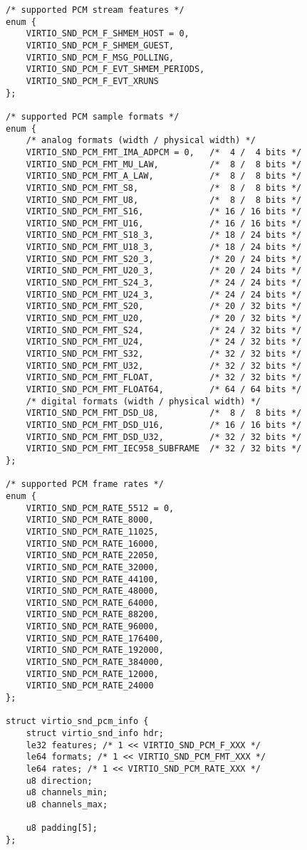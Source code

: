 \begin{lstlisting}
/* supported PCM stream features */
enum {
    VIRTIO_SND_PCM_F_SHMEM_HOST = 0,
    VIRTIO_SND_PCM_F_SHMEM_GUEST,
    VIRTIO_SND_PCM_F_MSG_POLLING,
    VIRTIO_SND_PCM_F_EVT_SHMEM_PERIODS,
    VIRTIO_SND_PCM_F_EVT_XRUNS
};

/* supported PCM sample formats */
enum {
    /* analog formats (width / physical width) */
    VIRTIO_SND_PCM_FMT_IMA_ADPCM = 0,   /*  4 /  4 bits */
    VIRTIO_SND_PCM_FMT_MU_LAW,          /*  8 /  8 bits */
    VIRTIO_SND_PCM_FMT_A_LAW,           /*  8 /  8 bits */
    VIRTIO_SND_PCM_FMT_S8,              /*  8 /  8 bits */
    VIRTIO_SND_PCM_FMT_U8,              /*  8 /  8 bits */
    VIRTIO_SND_PCM_FMT_S16,             /* 16 / 16 bits */
    VIRTIO_SND_PCM_FMT_U16,             /* 16 / 16 bits */
    VIRTIO_SND_PCM_FMT_S18_3,           /* 18 / 24 bits */
    VIRTIO_SND_PCM_FMT_U18_3,           /* 18 / 24 bits */
    VIRTIO_SND_PCM_FMT_S20_3,           /* 20 / 24 bits */
    VIRTIO_SND_PCM_FMT_U20_3,           /* 20 / 24 bits */
    VIRTIO_SND_PCM_FMT_S24_3,           /* 24 / 24 bits */
    VIRTIO_SND_PCM_FMT_U24_3,           /* 24 / 24 bits */
    VIRTIO_SND_PCM_FMT_S20,             /* 20 / 32 bits */
    VIRTIO_SND_PCM_FMT_U20,             /* 20 / 32 bits */
    VIRTIO_SND_PCM_FMT_S24,             /* 24 / 32 bits */
    VIRTIO_SND_PCM_FMT_U24,             /* 24 / 32 bits */
    VIRTIO_SND_PCM_FMT_S32,             /* 32 / 32 bits */
    VIRTIO_SND_PCM_FMT_U32,             /* 32 / 32 bits */
    VIRTIO_SND_PCM_FMT_FLOAT,           /* 32 / 32 bits */
    VIRTIO_SND_PCM_FMT_FLOAT64,         /* 64 / 64 bits */
    /* digital formats (width / physical width) */
    VIRTIO_SND_PCM_FMT_DSD_U8,          /*  8 /  8 bits */
    VIRTIO_SND_PCM_FMT_DSD_U16,         /* 16 / 16 bits */
    VIRTIO_SND_PCM_FMT_DSD_U32,         /* 32 / 32 bits */
    VIRTIO_SND_PCM_FMT_IEC958_SUBFRAME  /* 32 / 32 bits */
};

/* supported PCM frame rates */
enum {
    VIRTIO_SND_PCM_RATE_5512 = 0,
    VIRTIO_SND_PCM_RATE_8000,
    VIRTIO_SND_PCM_RATE_11025,
    VIRTIO_SND_PCM_RATE_16000,
    VIRTIO_SND_PCM_RATE_22050,
    VIRTIO_SND_PCM_RATE_32000,
    VIRTIO_SND_PCM_RATE_44100,
    VIRTIO_SND_PCM_RATE_48000,
    VIRTIO_SND_PCM_RATE_64000,
    VIRTIO_SND_PCM_RATE_88200,
    VIRTIO_SND_PCM_RATE_96000,
    VIRTIO_SND_PCM_RATE_176400,
    VIRTIO_SND_PCM_RATE_192000,
    VIRTIO_SND_PCM_RATE_384000,
    VIRTIO_SND_PCM_RATE_12000,
    VIRTIO_SND_PCM_RATE_24000
};

struct virtio_snd_pcm_info {
    struct virtio_snd_info hdr;
    le32 features; /* 1 << VIRTIO_SND_PCM_F_XXX */
    le64 formats; /* 1 << VIRTIO_SND_PCM_FMT_XXX */
    le64 rates; /* 1 << VIRTIO_SND_PCM_RATE_XXX */
    u8 direction;
    u8 channels_min;
    u8 channels_max;

    u8 padding[5];
};
\end{lstlisting}

